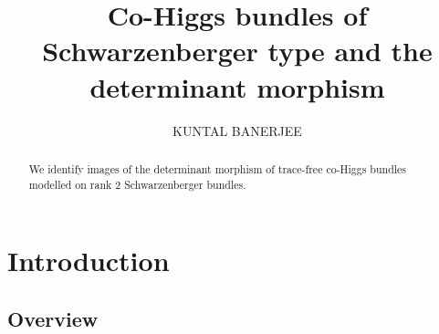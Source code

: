 \documentclass[12pt]{amsart}
\title[Co-Higgs bundles of Schwarzenberger type and the determinant morphism]{Co-Higgs bundles of Schwarzenberger type and the determinant morphism}
\author{KUNTAL BANERJEE}
\theoremstyle{definition}
\theoremstyle{remark}
\numberwithin{equation}{section}
\begin{document}
\begin{abstract}
We identify images of the determinant morphism of trace-free co-Higgs bundles modelled on rank $2$ Schwarzenberger bundles.
\end{abstract}
\maketitle 

\let\thefootnote\relax{}\let\thefootnote\relax\footnotetext{}\let\thefootnote\relax\footnotetext{}

\section{Introduction}
\subsection{Overview}
\end{document}

